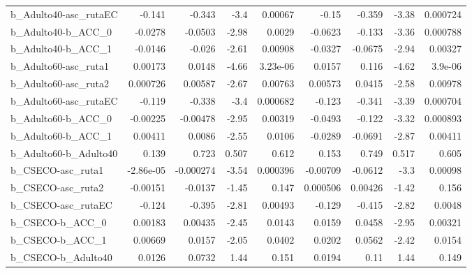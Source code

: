 \begin{tabular}{lrrrrrrrr}
b\_Adulto40-asc\_rutaEC      &      -0.141 &       -0.343 &     -3.4 &  0.00067 &      -0.15 &      -0.359 &        -3.38 &      0.000724 \\
b\_Adulto40-b\_ACC\_0         &     -0.0278 &      -0.0503 &    -2.98 &   0.0029 &    -0.0623 &      -0.133 &        -3.36 &      0.000788 \\
b\_Adulto40-b\_ACC\_1         &     -0.0146 &       -0.026 &    -2.61 &  0.00908 &    -0.0327 &     -0.0675 &        -2.94 &       0.00327 \\
b\_Adulto60-asc\_ruta1       &     0.00173 &       0.0148 &    -4.66 & 3.23e-06 &     0.0157 &       0.116 &        -4.62 &       3.9e-06 \\
b\_Adulto60-asc\_ruta2       &    0.000726 &      0.00587 &    -2.67 &  0.00763 &    0.00573 &      0.0415 &        -2.58 &       0.00978 \\
b\_Adulto60-asc\_rutaEC      &      -0.119 &       -0.338 &     -3.4 & 0.000682 &     -0.123 &      -0.341 &        -3.39 &      0.000704 \\
b\_Adulto60-b\_ACC\_0         &    -0.00225 &     -0.00478 &    -2.95 &  0.00319 &    -0.0493 &      -0.122 &        -3.32 &      0.000893 \\
b\_Adulto60-b\_ACC\_1         &     0.00411 &       0.0086 &    -2.55 &   0.0106 &    -0.0289 &     -0.0691 &        -2.87 &       0.00411 \\
b\_Adulto60-b\_Adulto40      &       0.139 &        0.723 &    0.507 &    0.612 &      0.153 &       0.749 &        0.517 &         0.605 \\
b\_CSECO-asc\_ruta1          &   -2.86e-05 &    -0.000274 &    -3.54 & 0.000396 &   -0.00709 &     -0.0612 &         -3.3 &       0.00098 \\
b\_CSECO-asc\_ruta2          &    -0.00151 &      -0.0137 &    -1.45 &    0.147 &   0.000506 &     0.00426 &        -1.42 &         0.156 \\
b\_CSECO-asc\_rutaEC         &      -0.124 &       -0.395 &    -2.81 &  0.00493 &     -0.129 &      -0.415 &        -2.82 &        0.0048 \\
b\_CSECO-b\_ACC\_0            &     0.00183 &      0.00435 &    -2.45 &   0.0143 &     0.0159 &      0.0458 &        -2.95 &       0.00321 \\
b\_CSECO-b\_ACC\_1            &     0.00669 &       0.0157 &    -2.05 &   0.0402 &     0.0202 &      0.0562 &        -2.42 &        0.0154 \\
b\_CSECO-b\_Adulto40         &      0.0126 &       0.0732 &     1.44 &    0.151 &     0.0194 &        0.11 &         1.44 &         0.149 \\

\end{tabular}
